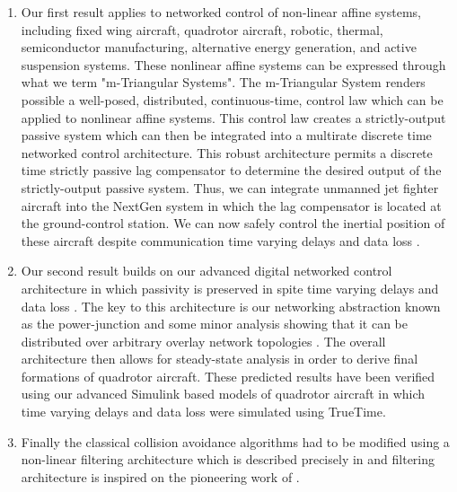 \begin{enumerate}
\item Our first result applies to networked control of non-linear affine systems, including fixed wing aircraft, quadrotor aircraft, robotic, thermal, semiconductor manufacturing, alternative energy generation, and active suspension systems. These nonlinear affine systems can be expressed through what we term "m-Triangular Systems". The m-Triangular System renders possible a well-posed, distributed, continuous-time, control law which can be applied to nonlinear affine systems. This control law creates a strictly-output passive system which can then be integrated into a multirate discrete time networked control architecture. This robust architecture permits a discrete time strictly passive lag compensator to determine the desired output of the strictly-output passive system. Thus, we can integrate unmanned jet fighter aircraft into the NextGen system in which the lag compensator is located at the ground-control station. We can now safely control the inertial position of these aircraft despite communication time varying delays and data loss \cite{NK_1a,NK_1b,NK_1c}.
\item Our second result builds on our advanced digital networked control architecture in which passivity is preserved in spite time varying delays and data loss \cite{NK_2}.  The key to this architecture is our networking abstraction known as the power-junction and some minor analysis showing that it can be distributed over arbitrary overlay network topologies \cite{NK_3a,NK_3b}.  The overall architecture then allows for steady-state analysis in order to derive final formations of quadrotor aircraft.  These predicted results have been verified using our advanced Simulink based models of quadrotor aircraft in which time varying delays and data loss were simulated using TrueTime.  
\item Finally the classical collision avoidance algorithms \cite{NK_4a,NK_4b} had to be modified using a non-linear filtering architecture which is described precisely in \cite{NK_1a} and filtering architecture is inspired on the pioneering work of \cite{NK_5a,NK_5b,NK_5c}.
\end{enumerate}


